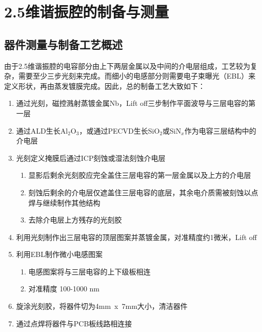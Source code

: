 \chapter{2.5维谐振腔的制备与测量} %
\label{cha:2_5维谐振腔的制备与测量}
	


        \section{器件测量与制备工艺概述} %
        \label{sec:制备工艺概述}

            由于2.5维谐振腔的电容部分由上下两层金属以及中间的介电层组成，工艺较为复杂，需要至少三步光刻来完成。而细小的电感部分则需要电子束曝光（EBL）来定义形状，再由蒸发镀膜完成。因此，总的制备工艺大致如下：

            \begin{enumerate}
                \item 通过光刻，磁控溅射蒸镀金属Nb，Lift off三步制作平面波导与三层电容的第一层
                \item 通过ALD生长Al$_2$O$_3$，或通过PECVD生长SiO$_2$或SiN$_x$作为电容三层结构中的介电层
                \item 光刻定义掩膜后通过ICP刻蚀或湿法刻蚀介电层
                    \begin{enumerate}
                        \item 显影后剩余光刻胶应完全盖住三层电容的第一层金属以及上方的介电层
                        \item 刻蚀后剩余的介电层仅遮盖住三层电容的底层，其余电介质需被刻蚀以点焊与继续制作其他结构
                        \item 去除介电层上方残存的光刻胶
                    \end{enumerate}
                \item 利用光刻制作出三层电容的顶层图案并蒸镀金属，对准精度约1微米，Lift off
                \item 利用EBL制作微小电感图案
                    \begin{enumerate}
                        \item 电感图案将与三层电容的上下级板相连
                        \item 对准精度 100-1000 nm
                    \end{enumerate}
                \item 旋涂光刻胶，将器件切为4mm~x~7mm大小，清洁器件
                \item 通过点焊将器件与PCB板线路相连接
            \end{enumerate}


